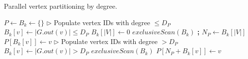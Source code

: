 \begin{algorithm}[!hbt]
\caption{Parallel vertex partitioning by degree.}
\label{alg:partition}
\begin{algorithmic}[1]

\Statex

  \State $P \gets B_k \gets \{\}$
  \State $\rhd$ Populate vertex IDs with degree $\leq D_P$
    \State $B_k[v] \gets |G.out(v)| \leq D_P$
  \EndFor
  \State $B_k[|V|] \gets 0$
  \State $exclusiveScan(B_k)$ \textbf{;} $N_P \gets B_k[|V|]$
     $P[B_k[v]] \gets v$
    \EndIf
  \EndFor
  \State $\rhd$ Populate vertex IDs with degree $> D_P$
    \State $B_k[v] \gets |G.out(v)| > D_P$
  \EndFor
  \State $exclusiveScan(B_k)$
     $P[N_P + B_k[v]] \gets v$
    \EndIf
  \EndFor
  \State {} \label{alg:partition--return}
\EndFunction
\end{algorithmic}
\end{algorithm}
